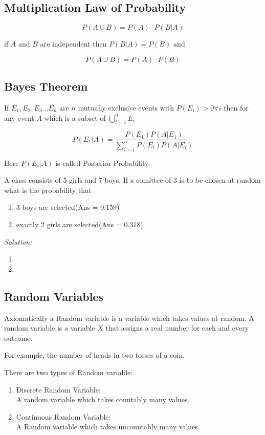 \documentclass[11pt,letterpaper]{article}
\newenvironment{problem}[2][Problem]                                  
        {\begin{tcolorbox}[colback=white,colframe=gray!50,title=#1 #2]}
        {\end{tcolorbox}}
\newenvironment{solution}                      
        {\begin{mdframed}\textit{Solution:} \\}
        {\end{mdframed}}
\begin{document}
\subsection{Multiplication Law of Probability}
\[
  P(A\cup B) = P(A) \cdot P( B \vert A )
\]

if $A$ and $B$ are independent then $ P( B \vert A ) = P(B)$ and 

\[
  P(A\cup B) = P(A) \cdot P( B )
\]

\subsection{Bayes Theorem}
If $E_1, E_2, E_3 \dots E_n$ are $n$ mutually exclusive events with $P(E_i) > 0 \forall i$ then for any event $A$ 
which is a subset of $\bigcup_{i=1}^n E_i$ 

\[
  P(E_1 \vert A) = \frac{P(E_1) P(A \vert E_1)}{\sum_{i=1}^n{P(E_i) P(A \vert E_i)}}
\]

Here $P(E_i \vert A)$ is called Posterior Probability.

\begin{problem}8
  A class consists of 5 girls and 7 boys. If a comittee of 3 is to be chosen at random what is the probability that 
  \begin{enumerate}
    \item 3 boys are selected\hfill (Ans = 0.159)
    \item exactly 2 girls are selected\hfill (Ans = 0.318)
  \end{enumerate}
\end{problem}
\begin{solution}
  \begin{enumerate}
    \item 
    \item 
  \end{enumerate}
\end{solution}

\subsection{Random Variables}
Axiomatically a Random variable is a variable which takes values at random.
A random variable is a variable $X$ that assigns a real number for each and every outcome. 

For example, the number of heads in two tosses of a coin.

There are two types of Random variable:
\begin{enumerate}
  \item Discrete Random Variable: \\
    A random variable which takes countably many values. 
  \item Continuous Random Variable: \\ 
    A Random variable which takes uncountably many values.
\end{enumerate}
\end{document}

